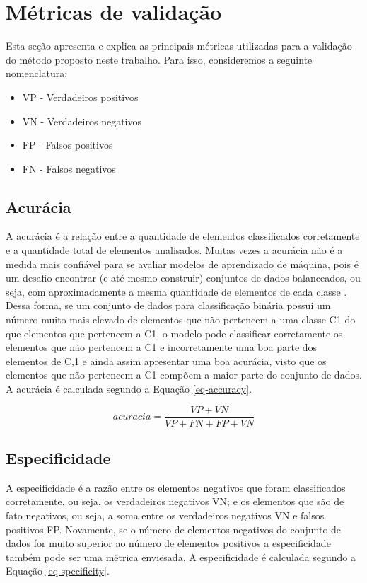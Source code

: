 \section{Métricas de validação}
Esta seção apresenta e explica as principais métricas utilizadas para a validação do método proposto neste trabalho.
Para isso, consideremos a seguinte nomenclatura:

 \begin{itemize}
   \item VP - Verdadeiros positivos
   \item VN - Verdadeiros negativos
   \item FP - Falsos positivos
   \item FN - Falsos negativos
 \end{itemize}
   
\subsection{Acurácia}
A acurácia é a relação entre a quantidade de elementos classificados corretamente e a quantidade total de elementos analisados. Muitas vezes a acurácia não é a medida mais confiável para se avaliar modelos de aprendizado de máquina, pois é um desafio encontrar (e até mesmo construir) conjuntos de dados balanceados, ou seja, com aproximadamente a mesma quantidade de elementos de cada classe \cite{9075071}. Dessa forma, se um conjunto de dados para classificação binária possui um número muito mais elevado de elementos que não pertencem a uma classe C1 do que elementos que pertencem a C1, o modelo pode classificar corretamente os elementos que não pertencem a C1 e incorretamente uma boa parte dos elementos de C,1 e ainda assim apresentar uma boa acurácia, visto que os elementos que não pertencem a C1 compõem a maior parte do conjunto de dados. 
A acurácia é calculada segundo a Equação \ref{eq-accuracy}.

\begin{equation}
acuracia = \frac{VP + VN}{VP + FN + FP + VN}
\label{eq-accuracy}
\end{equation}

\subsection{Especificidade}
A especificidade é a razão entre os elementos negativos que foram classificados corretamente, ou seja, os verdadeiros negativos VN; e os elementos que são de fato negativos, ou seja, a soma entre os verdadeiros negativos VN e falsos positivos FP.
Novamente, se o número de elementos negativos do conjunto de dados for muito superior ao número de elementos positivos a especificidade também pode ser uma métrica enviesada. 
A especificidade é calculada segundo a Equação \ref{eq-specificity}.


